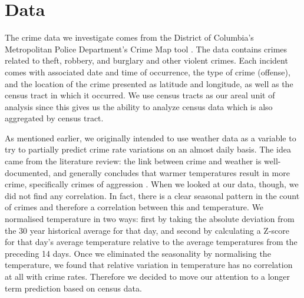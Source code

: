 \documentclass [a4paper,12 pt]{article}
\begin{document}
\section{Data}\label{sec_data}

The crime data we investigate comes from the District of Columbia's Metropolitan Police Department's Crime Map tool \citep{metPolice}. The data contains crimes related to theft, robbery, and burglary and other violent crimes. Each incident comes with associated date and time of occurrence, the type of crime (offense), and the location of the crime presented as latitude and longitude, as well as the census tract in which it occurred. We use census tracts as our areal unit of analysis since this gives us the ability to analyze census data which is also aggregated by census tract. 

As mentioned earlier, we originally intended to use weather data as a variable to try to partially predict crime rate variations on an almost daily basis. The idea came from the literature review: the link between crime and weather is well-documented, and generally concludes that warmer temperatures result in more crime, specifically crimes of aggression \citep{cohn1990weather}. When we looked at our data, though, we did not find any correlation. In fact, there is a clear seasonal pattern in the count of crimes and therefore a correlation between this and temperature. We normalised temperature in two ways: first by taking the absolute deviation from the 30 year historical average for that day, and second by calculating a Z-score for that day's average temperature relative to the average temperatures from the preceding 14 days. Once we eliminated the seasonality by normalising the temperature, we found that relative variation in temperature has no correlation at all with crime rates. Therefore we decided to move our attention to a longer term prediction based on census data.
\end{document}
